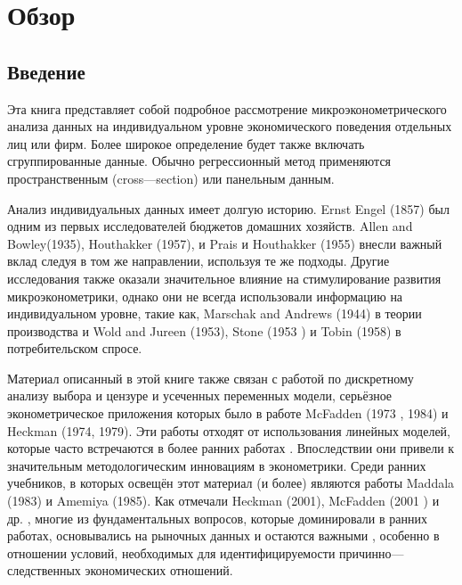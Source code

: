 \chapter{Обзор}

\section{Введение}

	Эта книга представляет собой подробное рассмотрение микроэконометрического анализа данных на индивидуальном уровне экономического поведения отдельных лиц или фирм. Более широкое определение будет также включать сгруппированные данные. Обычно регрессионный метод применяются пространственным (cross---section) или панельным данным.
	
	
	Анализ индивидуальных данных имеет долгую историю. Ernst Engel (1857) был одним из первых исследователей  бюджетов домашних хозяйств. Allen and Bowley(1935), Houthakker (1957), и Prais и Houthakker (1955) внесли важный вклад следуя в том же направлении, используя те же подходы. Другие исследования также оказали значительное влияние на стимулирование развития микроэконометрики, однако они не всегда использовали информацию на индивидуальном уровне, такие как, Marschak and Andrews (1944) в теории производства и Wold and Jureen  (1953), Stone (1953 ) и Tobin (1958) в потребительском спросе.
	
	
	Материал описанный в этой книге также связан с работой по дискретному анализу выбора и цензуре и усеченных переменных модели, серьёзное эконометрическое приложения которых было в работе McFadden (1973 , 1984) и Heckman (1974, 1979). Эти работы отходят от использования линейных моделей, которые часто встречаются в более ранних работах . Впоследствии они привели к значительным методологическим инновациям в эконометрики. Среди ранних учебников, в которых освещён этот материал (и более) являются работы Maddala (1983) и Amemiya (1985). Как отмечали Heckman (2001), McFadden (2001 ) и др. , многие из фундаментальных вопросов, которые доминировали в ранних работах, основывались на рыночных данных и остаются важными , особенно в отношении условий, необходимых для идентифицируемости причинно---следственных экономических отношений.
	
